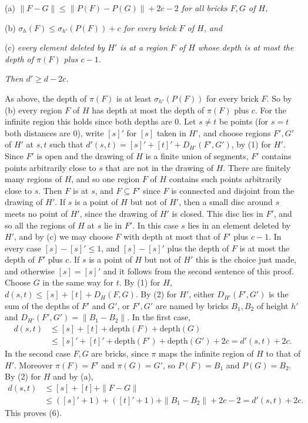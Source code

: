 {\hspace*{12pt}(a) \textit{$\|F - G\| \le \|P(F) - P(G)\| + 2c - 2$ for all bricks $F, G$ of $H$,}

\hspace*{12pt}(b) \textit{$\sigma_h(F) \le \sigma_{h'}(P(F)) + c$ for every brick $F$ of $H$, and}

\hspace*{12pt}(c) \textit{every element deleted by $H'$ is at a region $F$ of $H$ whose depth is at most the depth of $\pi(F)$ plus $c - 1$.}

\textit{Then $d' \ge d - 2c$.}

As above, the depth of $\pi(F)$ is at least $\sigma_{h'}(P(F))$ for every brick $F$. So by (b) every region $F$ of $H$ has depth at most the depth of $\pi(F)$ plus $c$. For the infinite region this holds since both depths are $0$. Let $s \ne t$ be points (for $s = t$ both distances are $0$), write $[s]'$ for $[s]$ taken in $H'$, and choose regions $F', G'$ of $H'$ at $s, t$ such that $d'(s, t) = [s]' + [t]' + D_{H'}(F', G')$, by (1) for $H'$. Since $F'$ is open and the drawing of $H$ is a finite union of segments, $F'$ contains points arbitrarily close to $s$ that are not in the drawing of $H$. There are finitely many regions of $H$, and so one region $F$ of $H$ contains such points arbitrarily close to $s$. Then $F$ is at $s$, and $F \subseteq F'$ since $F$ is connected and disjoint from the drawing of $H'$. If $s$ is a point of $H$ but not of $H'$, then a small disc around $s$ meets no point of $H'$, since the drawing of $H'$ is closed. This disc lies in $F'$, and so all the regions of $H$ at $s$ lie in $F'$. In this case $s$ lies in an element deleted by $H'$, and by (c) we may choose $F$ with depth at most that of $F'$ plus $c - 1$. In every case $[s] - [s]' \le 1$, and $[s] - [s]'$ plus the depth of $F$ is at most the depth of $F'$ plus $c$. If $s$ is a point of $H$ but not of $H'$ this is the choice just made, and otherwise $[s] = [s]'$ and it follows from the second sentence of this proof. Choose $G$ in the same way for $t$. By (1) for $H$, $d(s, t) \le [s] + [t] + D_H(F, G)$. By (2) for $H'$, either $D_{H'}(F', G')$ is the sum of the depths of $F'$ and $G'$, or $F', G'$ are named by bricks $B_1, B_2$ of height $h'$ and $D_{H'}(F', G') = \|B_1 - B_2\|$. In the first case,
\begin{align*}
d(s, t) &\le [s] + [t] + \text{depth}(F) + \text{depth}(G)\\
&\le [s]' + [t]' + \text{depth}(F') + \text{depth}(G') + 2c = d'(s, t) + 2c.
\end{align*}
In the second case $F, G$ are bricks, since $\pi$ maps the infinite region of $H$ to that of $H'$. Moreover $\pi(F) = F'$ and $\pi(G) = G'$, so $P(F) = B_1$ and $P(G) = B_2$. By (2) for $H$ and by (a),
\begin{align*}
d(s, t) &\le [s] + [t] + \|F - G\|\\
&\le ([s]' + 1) + ([t]' + 1) + \|B_1 - B_2\| + 2c - 2 = d'(s, t) + 2c.
\end{align*}
This proves (6).

}
